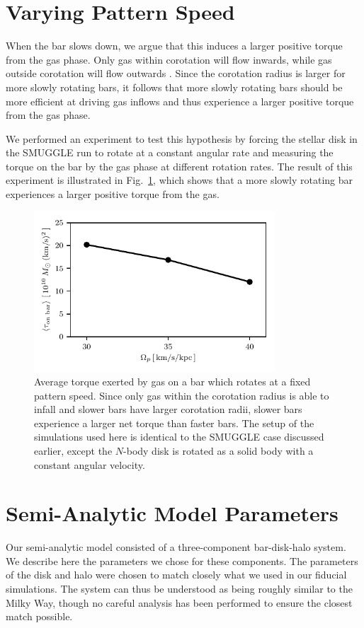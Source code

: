 \documentclass[twocolumn,linenumbers]{aastex631}
\newcommand{\Nbody}{$N$-body}
\newcommand{\SMUGGLE}{SMUGGLE}
\begin{document}
\section{Varying Pattern Speed}
\label{app:varyps}
When the bar slows down, we argue that this induces a larger positive torque
from the gas phase. Only gas within corotation will flow inwards, while gas
outside corotation will flow outwards \citep{2011MNRAS.415.1027H}. Since the
corotation radius is larger for more slowly rotating bars, it follows that
more slowly rotating bars should be more efficient at driving gas inflows and
thus experience a larger positive torque from the gas phase.

We performed an experiment to test this hypothesis by forcing the stellar disk
in the \SMUGGLE{} run to rotate at a constant angular rate and measuring the
torque on the bar by the gas phase at different rotation rates. The result of
this experiment is illustrated in Fig.~\ref{fig:equil}, which shows that a more
slowly rotating bar experiences a larger positive torque from the gas.

\begin{figure}
    \centering
    \includegraphics[width=9cm]{fig/torque_ps.pdf}
    \caption{Average torque exerted by gas on a bar which rotates at a fixed
    pattern speed. Since only gas within the corotation radius is able to infall
    and slower bars have larger corotation radii, slower bars experience a
    larger net torque than faster bars. The setup of the simulations used here
    is identical to the \SMUGGLE{} case discussed earlier, except the \Nbody{} disk
    is rotated as a solid body with a constant angular
    velocity.}
    \label{fig:equil}
\end{figure}

\section{Semi-Analytic Model Parameters}
\label{app:sam}
Our semi-analytic model consisted of a three-component bar-disk-halo system. We
describe here the parameters we chose for these components. The parameters of
the disk and halo were chosen to match closely what we used in our fiducial
simulations. The system can thus be understood as being roughly similar to the
Milky Way, though no careful analysis has been performed to ensure the closest
match possible.
\end{document}

